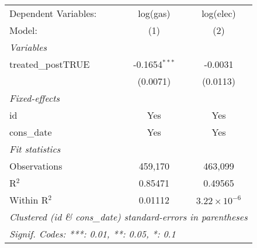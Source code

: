 
\begin{tabular}{lcc}
   \tabularnewline\midrule\midrule
   Dependent Variables: & log(gas)        & log(elec)\\
   Model:               & (1)             & (2)\\
   \midrule \emph{Variables} &   &  \\
   treated\_postTRUE   & -0.1654$^{***}$ & -0.0031\\
                        & (0.0071)        & (0.0113)\\
   \midrule \emph{Fixed-effects} &   &  \\
   id                   & Yes             & Yes\\
   cons\_date          & Yes             & Yes\\
   \midrule \emph{Fit statistics} &   &  \\
   Observations         & 459,170         & 463,099\\
   R$^2$                & 0.85471         & 0.49565\\
   Within R$^2$         & 0.01112         & $3.22\times 10^{-6}$\\
   \midrule\midrule\multicolumn{3}{l}{\emph{Clustered (id \& cons\_date) standard-errors in parentheses}}\\
   \multicolumn{3}{l}{\emph{Signif. Codes: ***: 0.01, **: 0.05, *: 0.1}}\\
\end{tabular}



